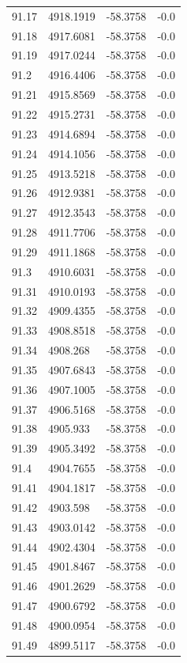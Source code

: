 \begin{table}[H]
\begin{tabular}{llll}
91.17 & 4918.1919 & -58.3758 & -0.0 \\
91.18 & 4917.6081 & -58.3758 & -0.0 \\
91.19 & 4917.0244 & -58.3758 & -0.0 \\
91.2 & 4916.4406 & -58.3758 & -0.0 \\
91.21 & 4915.8569 & -58.3758 & -0.0 \\
91.22 & 4915.2731 & -58.3758 & -0.0 \\
91.23 & 4914.6894 & -58.3758 & -0.0 \\
91.24 & 4914.1056 & -58.3758 & -0.0 \\
91.25 & 4913.5218 & -58.3758 & -0.0 \\
91.26 & 4912.9381 & -58.3758 & -0.0 \\
91.27 & 4912.3543 & -58.3758 & -0.0 \\
91.28 & 4911.7706 & -58.3758 & -0.0 \\
91.29 & 4911.1868 & -58.3758 & -0.0 \\
91.3 & 4910.6031 & -58.3758 & -0.0 \\
91.31 & 4910.0193 & -58.3758 & -0.0 \\
91.32 & 4909.4355 & -58.3758 & -0.0 \\
91.33 & 4908.8518 & -58.3758 & -0.0 \\
91.34 & 4908.268 & -58.3758 & -0.0 \\
91.35 & 4907.6843 & -58.3758 & -0.0 \\
91.36 & 4907.1005 & -58.3758 & -0.0 \\
91.37 & 4906.5168 & -58.3758 & -0.0 \\
91.38 & 4905.933 & -58.3758 & -0.0 \\
91.39 & 4905.3492 & -58.3758 & -0.0 \\
91.4 & 4904.7655 & -58.3758 & -0.0 \\
91.41 & 4904.1817 & -58.3758 & -0.0 \\
91.42 & 4903.598 & -58.3758 & -0.0 \\
91.43 & 4903.0142 & -58.3758 & -0.0 \\
91.44 & 4902.4304 & -58.3758 & -0.0 \\
91.45 & 4901.8467 & -58.3758 & -0.0 \\
91.46 & 4901.2629 & -58.3758 & -0.0 \\
91.47 & 4900.6792 & -58.3758 & -0.0 \\
91.48 & 4900.0954 & -58.3758 & -0.0 \\
91.49 & 4899.5117 & -58.3758 & -0.0 \\

\end{tabular}
\end{table}
